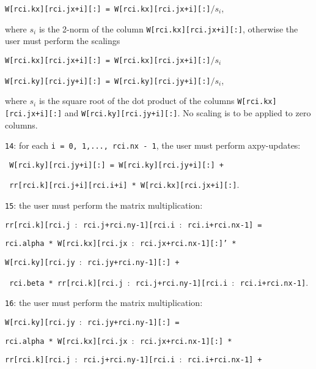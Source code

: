 \begin{description}
\begin{description}
\hspace{8mm}
{\tt W[rci.kx][rci.jx+i][:] = W[rci.kx][rci.jx+i][:]$/s_i$},

where $s_i$ is the 2-norm of the column 
{\tt W[rci.kx][rci.jx+i][:]},
otherwise the user must perform the scalings

\hspace{8mm}
{\tt W[rci.kx][rci.jx+i][:] = W[rci.kx][rci.jx+i][:]$/s_i$}

\hspace{8mm}
{\tt W[rci.ky][rci.jy+i][:] = W[rci.ky][rci.jy+i][:]$/s_i$},

where $s_i$ is the square root of the dot product of 
the columns 
{\tt W[rci.kx][rci.jx+i][:]} and
{\tt W[rci.ky][rci.jy+i][:]}.
No scaling is to be applied to zero columns.
%
\item
{\tt 14}: 
for each {\tt i = 0, 1,..., rci.nx - 1}, 
the user must perform axpy-updates:

\hspace{8mm}
{\tt 
W[rci.ky][rci.jy+i][:] = 
W[rci.ky][rci.jy+i][:] + 
}

\hspace{12mm}
{\tt
rr[rci.k][rci.j+i][rci.i+i] * W[rci.kx][rci.jx+i][:]}.
%
\item
{\tt 15}: the user must perform the matrix multiplication:

\hspace{8mm}
{\tt rr[rci.k][rci.j $:$ rci.j+rci.ny-1][rci.i $:$ rci.i+rci.nx-1] =}

\hspace{12mm}
{\tt rci.alpha *
   W[rci.kx][rci.jx $:$ rci.jx+rci.nx-1][:]' *}

\hspace{16mm}
{\tt W[rci.ky][rci.jy $:$ rci.jy+rci.ny-1][:] +}

\hspace{12mm}
{\tt 
rci.beta *
rr[rci.k][rci.j $:$ rci.j+rci.ny-1][rci.i $:$ rci.i+rci.nx-1]}.

%
\item
{\tt 16}: the user must perform the matrix multiplication:

\hspace{8mm}
{\tt W[rci.ky][rci.jy $:$ rci.jy+rci.ny-1][:] =}

\hspace{12mm}
{\tt rci.alpha *
W[rci.kx][rci.jx $:$ rci.jx+rci.nx-1][:] *}

\hspace{16mm}
{\tt rr[rci.k][rci.j $:$ rci.j+rci.ny-1][rci.i $:$ rci.i+rci.nx-1] + }


\end{description}
\end{description}
